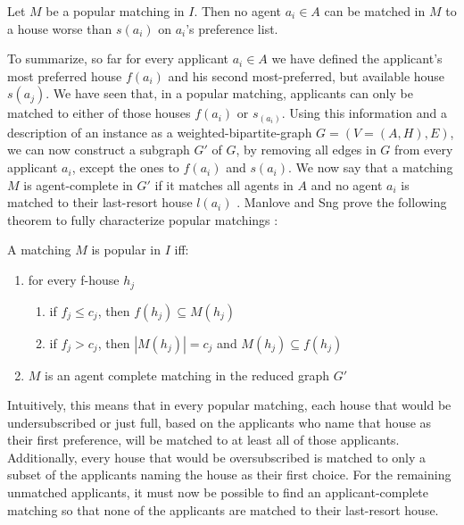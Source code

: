 \newtheorem{lemma-popular-3}[theorem]{Lemma}
\begin{lemma}\label{lemma-popular3}
    Let $M$ be a popular matching in $I$. Then no agent $a_i \in A$ can be matched in $M$ to a house worse than $s(a_i)$ on $a_i$'s preference list.
\end{lemma} 

To summarize, so far for every applicant $a_i \in A$ we have defined the applicant's most preferred house $f(a_i)$ and his second most-preferred, but available house $s(a_j)$. We have seen that, in a popular matching, applicants can only be matched to either of those houses $f(a_i)$ or $s_(a_i)$. Using this information and a description of an instance as a weighted-bipartite-graph $G = (V=(A, H), E)$, we can now construct a subgraph $G'$ of $G$, by removing all edges in $G$ from every applicant $a_i$, except the ones to $f(a_i)$ and $s(a_i)$. We now say that a matching $M$ is agent-complete in $G'$ if it matches all agents in $A$ and no agent $a_i$ is matched to their last-resort house $l(a_i)$ \cite{ManlovePopularMatchings}. Manlove and Sng prove the following theorem to fully characterize popular matchings \cite{ManlovePopularMatchings}:
\newtheorem{theorem-popular-4}[theorem]{Theorem}
\begin{theorem}\label{theorem-popular-4}
    A matching $M$ is popular in $I$ iff:
    \begin{enumerate}
        \item for every f-house $h_j$
        \begin{enumerate}
            \item\label{condition1a} if $f_j \leq c_j$, then $f(h_j) \subseteq M(h_j)$
            \item\label{condition1b} if $f_j > c_j$, then $|M(h_j)| = c_j$ and $M(h_j) \subseteq f(h_j)$
        \end{enumerate}
        \item $M$ is an agent complete matching in the reduced graph $G'$
    \end{enumerate}
\end{theorem} 

Intuitively, this means that in every popular matching, each house that would be undersubscribed or just full, based on the applicants who name that house as their first preference, will be matched to at least all of those applicants. Additionally, every house that would be oversubscribed is matched to only a subset of the applicants naming the house as their first choice. For the remaining unmatched applicants, it must now be possible to find an applicant-complete matching so that none of the applicants are matched to their last-resort house.

